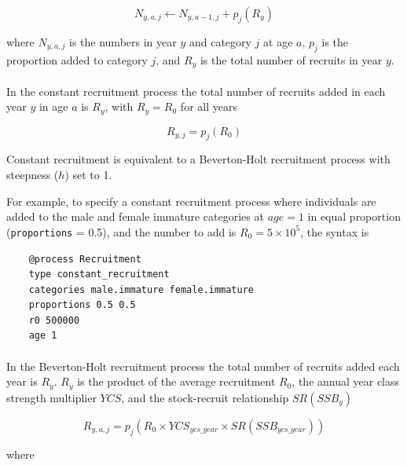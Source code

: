 \begin{equation}
N_{y,a,j} \leftarrow N_{y,a - 1,j} + p_j(R_y)
\end{equation}

where $N_{y,a,j}$ is the numbers in year $y$ and category $j$ at age $a$, $p_j$ is the proportion added to category $j$, and $R_y$ is the total number of recruits in year $y$.

\paragraph{}\label{sec:Process-RecruitmentConstant}

In the constant recruitment process the total number of recruits added in each year $y$ in age $a$ is $R_y$, with $R_y = R_0$ for all years

\begin{equation}
  R_{y,j} = p_j(R_0)
\end{equation}

Constant recruitment is equivalent to a Beverton-Holt recruitment process with steepness ($h$) set to 1.

For example, to specify a constant recruitment process where individuals are added to the male and female immature categories at $age=1$ in equal proportion (\texttt{proportions} = 0.5), and the number to add is $R_0=5 \times 10^5$, the syntax is

{\small{\begin{verbatim}
	@process Recruitment
	type constant_recruitment
	categories male.immature female.immature
	proportions 0.5 0.5
	r0 500000
	age 1
\end{verbatim}}}

\paragraph{}\label{sec:Process-RecruitmentBevertonHolt}

In the Beverton-Holt recruitment process the total number of recruits added each year is $R_y$. $R_y$ is the product of the average recruitment $R_0$, the annual year class strength multiplier $YCS$, and the stock-recruit relationship $SR(SSB_y)$

\begin{equation}\label{eq:BH}
  R_{y,a,j} = p_j(R_0 \times YCS_{ycs\_year} \times SR(SSB_{ycs\_year}))
\end{equation}

where

